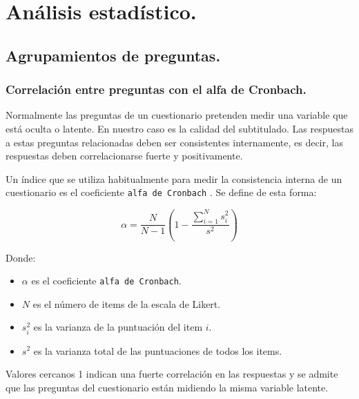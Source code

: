 \documentclass[
  12pt,
  a4paper,
  extrafontsizes,
  onecolumn,
  openright]{memoir}
\providecommand{\tightlist}{%
  \setlength{\itemsep}{0pt}\setlength{\parskip}{0pt}}\usepackage{longtable,booktabs,array}
\begin{document}

\hypertarget{sec-analisis}{%
\chapter{Análisis estadístico.}\label{sec-analisis}}

\hypertarget{sec-cluster}{%
\section{Agrupamientos de preguntas.}\label{sec-cluster}}

\hypertarget{sec-cronbach}{%
\subsection{Correlación entre preguntas con el alfa de
Cronbach.}\label{sec-cronbach}}

Normalmente las preguntas de un cuestionario pretenden medir una
variable que está oculta o latente. En nuestro caso es la calidad del
subtitulado. Las respuestas a estas preguntas relacionadas deben ser
consistentes internamente, es decir, las respuestas deben
correlacionarse fuerte y positivamente.

Un índice que se utiliza habitualmente para medir la consistencia
interna de un cuestionario es el coeficiente \texttt{alfa\ de\ Cronbach}
\autocite[ver][]{schweinberger2020survey}. Se define de esta forma:

\begin{equation}
\alpha = \frac{N}{N-1} \left(1 - \frac{\sum_{i=1}^{N} s_{i}^{2}}{s^{2}} \right)
\end{equation}

Donde:

\begin{itemize}
\tightlist
\item
  \(\alpha\) es el coeficiente \texttt{alfa\ de\ Cronbach}.
\item
  \(N\) es el número de items de la escala de Likert.
\item
  \(s_{i}^{2}\) es la varianza de la puntuación del item \(i\).
\item
  \(s^{2}\) es la varianza total de las puntuaciones de todos los items.
\end{itemize}

Valores cercanos 1 indican una fuerte correlación en las respuestas y se
admite que las preguntas del cuestionario están midiendo la misma
variable latente.
\end{document}
